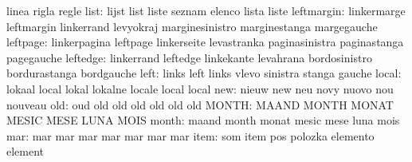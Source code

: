                            linea                     rigla
                           regle
                     list: lijst                     list
                           liste                     seznam
                           elenco                    lista
                           liste
               leftmargin: linkermarge               leftmargin
                           linkerrand                levyokraj
                           marginesinistro           marginestanga
                           margegauche
                 leftpage: linkerpagina              leftpage
                           linkerseite               levastranka
                           paginasinistra            paginastanga
                           pagegauche
                 leftedge: linkerrand                leftedge
                           linkekante                levahrana
                           bordosinistro             bordurastanga
                           bordgauche
                     left: links                     left
                           links                     vlevo
                           sinistra                  stanga
                           gauche
                    local: lokaal                    local
                           lokal                     lokalne
                           locale                    local
                           local
                      new: nieuw                     new
                           neu                       novy
                           nuovo                     nou
                           nouveau
                      old: oud                       old
                           old                       old
                           old                       old
                           old
                    MONTH: MAAND                     MONTH
                           MONAT                     MESIC
                           MESE                      LUNA
                           MOIS
                    month: maand                     month
                           monat                     mesic
                           mese                      luna
                           mois
                      mar: mar                       mar
                           mar                       mar
                           mar                       mar
                           mar
                     item: som                       item
                           pos                       polozka
                           elemento                  element
